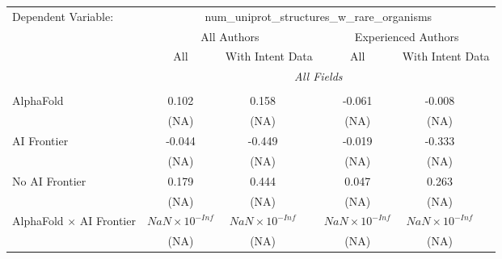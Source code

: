 \begingroup
\centering
\begin{tabular}{lcccccc}
   \tabularnewline \midrule \midrule
   Dependent Variable: & \multicolumn{6}{c}{num\_uniprot\_structures\_w\_rare\_organisms}\\
 & \multicolumn{3}{c}{All Authors} & \multicolumn{3}{c}{Experienced Authors} \\
\cmidrule(lr){2-4} \cmidrule(lr){5-7}
 & \multicolumn{1}{c}{All} & \multicolumn{2}{c}{With Intent Data} & \multicolumn{1}{c}{All} & \multicolumn{2}{c}{With Intent Data} \\
\cmidrule(lr){2-2} \cmidrule(lr){3-4} \cmidrule(lr){5-5} \cmidrule(lr){6-7}
 & \multicolumn{6}{c}{\textit{All Fields}} \\ \\
   AlphaFold                                                                  & 0.102                  & 0.158                  &                        & -0.061                 & -0.008                 &   \\   
                                                                              & (NA)                   & (NA)                   &                        & (NA)                   & (NA)                   &   \\   
   AI Frontier                                                                & -0.044                 & -0.449                 &                        & -0.019                 & -0.333                 &   \\   
                                                                              & (NA)                   & (NA)                   &                        & (NA)                   & (NA)                   &   \\   
   No AI Frontier                                                             & 0.179                  & 0.444                  &                        & 0.047                  & 0.263                  &   \\   
                                                                              & (NA)                   & (NA)                   &                        & (NA)                   & (NA)                   &   \\   
   AlphaFold $\times$ AI Frontier                                             & $NaN\times 10^{-Inf}$  & $NaN\times 10^{-Inf}$  &                        & $NaN\times 10^{-Inf}$  & $NaN\times 10^{-Inf}$  &   \\   
                                                                              & (NA)                   & (NA)                   &                        & (NA)                   & (NA)                   &   \\   

\end{tabular}
